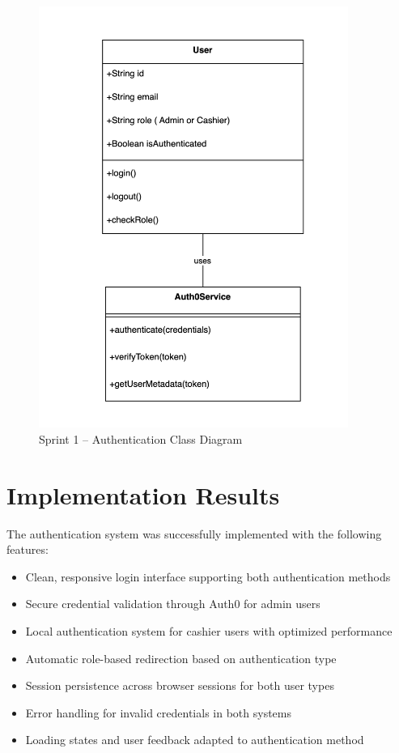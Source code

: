 \begin{figure}[H]
  \centering
  \includegraphics[width=0.9\textwidth]{figures/images/sprint1class.png}
  \caption{Sprint 1 – Authentication Class Diagram}
  \label{fig:sprint1-class}
\end{figure}

\section{Implementation Results}


The authentication system was successfully implemented with the following features:

\begin{itemize}
  \item Clean, responsive login interface supporting both authentication methods
  \item Secure credential validation through Auth0 for admin users
  \item Local authentication system for cashier users with optimized performance
  \item Automatic role-based redirection based on authentication type
  \item Session persistence across browser sessions for both user types
  \item Error handling for invalid credentials in both systems
  \item Loading states and user feedback adapted to authentication method
\end{itemize}

